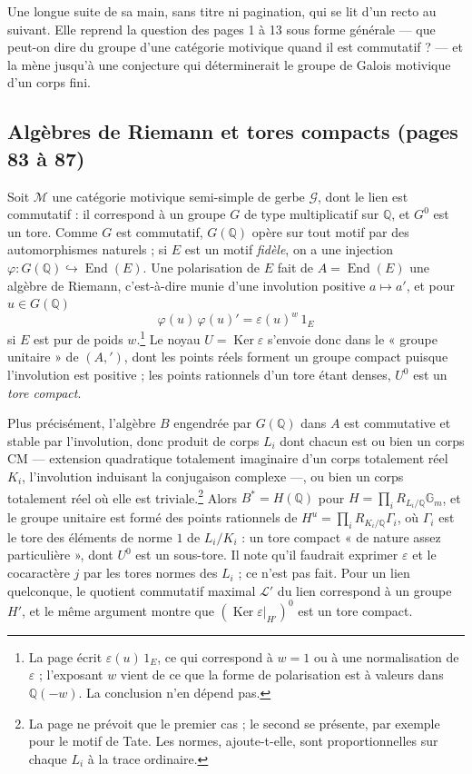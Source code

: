 \documentclass[11pt,a4paper]{article}
\begin{document}
Une longue suite de sa main, sans titre ni pagination, qui se lit d'un recto au
suivant. Elle reprend la question des pages 1 à 13 sous forme générale --- que
peut-on dire du groupe d'une catégorie motivique quand il est commutatif ? ---
et la mène jusqu'à une conjecture qui déterminerait le groupe de Galois
motivique d'un corps fini.

\subsection*{Algèbres de Riemann et tores compacts (pages 83 à 87)}

Soit $\mathcal{M}$ une catégorie motivique semi-simple de gerbe $\mathcal{G}$,
dont le lien est commutatif : il correspond à un groupe $G$ de type
multiplicatif sur $\mathbb{Q}$, et $G^{0}$ est un tore. Comme $G$ est
commutatif, $G(\mathbb{Q})$ opère sur tout motif par des automorphismes
naturels ; si $E$ est un motif \emph{fidèle}, on a une injection
$\varphi \colon G(\mathbb{Q}) \hookrightarrow \operatorname{End}(E)$. Une
polarisation de $E$ fait de $A = \operatorname{End}(E)$ une algèbre de Riemann,
c'est-à-dire munie d'une involution positive $a \mapsto a'$, et pour $u \in
G(\mathbb{Q})$
\[
  \varphi(u)\,\varphi(u)' = \varepsilon(u)^{w}\, 1_{E}
\]
si $E$ est pur de poids $w$.\footnote{La page écrit $\varepsilon(u)\,1_{E}$, ce
qui correspond à $w = 1$ ou à une normalisation de $\varepsilon$ ; l'exposant
$w$ vient de ce que la forme de polarisation est à valeurs dans
$\mathbb{Q}(-w)$. La conclusion n'en dépend pas.} Le noyau $U =
\operatorname{Ker}\varepsilon$ s'envoie donc dans le « groupe unitaire » de
$(A, ')$, dont les points réels forment un groupe compact puisque l'involution
est positive ; les points rationnels d'un tore étant denses, $U^{0}$ est un
\emph{tore compact}.

Plus précisément, l'algèbre $B$ engendrée par $G(\mathbb{Q})$ dans $A$ est
commutative et stable par l'involution, donc produit de corps $L_{i}$ dont chacun
est ou bien un corps CM --- extension quadratique totalement imaginaire d'un
corps totalement réel $K_{i}$, l'involution induisant la conjugaison complexe
---, ou bien un corps totalement réel où elle est triviale.\footnote{La page
ne prévoit que le premier cas ; le second se présente, par exemple pour le motif
de Tate. Les normes, ajoute-t-elle, sont proportionnelles sur chaque $L_{i}$ à
la trace ordinaire.} Alors $B^{*} = H(\mathbb{Q})$ pour $H =
\prod_{i} R_{L_{i}/\mathbb{Q}}\mathbb{G}_{m}$, et le groupe unitaire est formé
des points rationnels de $H^{u} = \prod_{i} R_{K_{i}/\mathbb{Q}}
\Gamma_{i}$, où $\Gamma_{i}$ est le tore des éléments de norme $1$ de
$L_{i}/K_{i}$ : un tore compact « de nature assez particulière », dont $U^{0}$
est un sous-tore. Il note qu'il faudrait exprimer $\varepsilon$ et le cocaractère
$j$ par les tores normes des $L_{i}$ ; ce n'est pas fait. Pour un lien quelconque,
le quotient commutatif maximal $\mathcal{L}'$ du lien correspond à un groupe
$H'$, et le même argument montre que $(\operatorname{Ker}\varepsilon|_{H'})^{0}$
est un tore compact.
\end{document}
